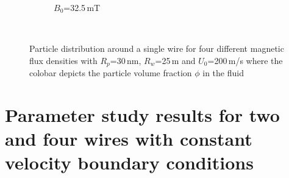 \begin{figure}[H]
\begin{subfigure}{0.49\textwidth}
                \caption{$B_{0}$=32.5\,mT}%
        \end{subfigure}
        \\        
        \caption[Particle distribution around a single wire for different magnetic flux densities]{Particle distribution around a single wire for four different magnetic flux densities with $R_{p}$=30\,nm, $R_{w}$=25\,\textmu m and $U_{0}$=200\,\textmu m/s where the colobar depicts the particle volume fraction $\phi$ in the fluid}
        \label{fig:Part_dist_wire}
  \end{figure}
\FloatBarrier
\section{Parameter study results for two and four wires with constant velocity boundary conditions}
\FloatBarrier
